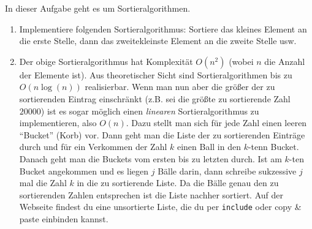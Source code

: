 \begin{aufg} In dieser Aufgabe geht es um Sortieralgorithmen.
\begin{enumerate} 
\item Implementiere folgenden Sortieralgorithmus: Sortiere das kleines Element an die erste Stelle, dann das zweitekleinste Element an die zweite Stelle usw.
\item Der obige Sortieralgorithmus hat Komplexität $O(n^2)$ (wobei $n$ die Anzahl der Elemente ist). Aus theoretischer Sicht sind Sortieralgorithmen bis zu $O(n \log(n))$ realisierbar. Wenn man nun aber die größer der zu sortierenden Eintrag einschränkt (z.B. sei die größte zu sortierende Zahl $20000$) ist es sogar möglich einen \emph{linearen} Sortieralgorithmus zu implementieren, also $O(n)$. Dazu stellt man sich für jede Zahl einen leeren ``Bucket'' (Korb) vor. Dann geht man die Liste der zu sortierenden Einträge durch und für ein Verkommen der Zahl $k$ einen Ball in den $k$-tenn Bucket. Danach geht man die Buckets vom ersten bis zu letzten durch. Ist am $k$-ten Bucket angekommen und es liegen $j$ Bälle darin, dann schreibe sukzessive $j$ mal die Zahl $k$ in die zu sortierende Liste. Da die Bälle genau den zu sortierenden Zahlen entsprechen ist die Liste nachher sortiert. Auf der Webseite findest du eine unsortierte Liste, die du per \verb|include| oder copy \& paste einbinden kannst.
\end{enumerate}
\end{aufg}